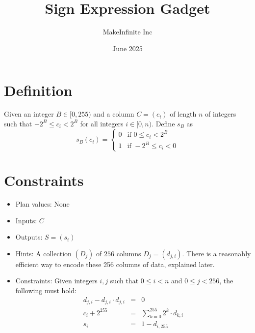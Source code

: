 \documentclass[11pt]{article}
\title{Sign Expression Gadget}
\author{MakeInfinite Inc}
\date{June 2025}
\begin{document}
\maketitle

\section{Definition}
\noindent Given an integer $B\in [0,255)$ and a column $C=(c_{i})$ of length $n$ of integers such that $-2^B\leq c_i<2^B$ for all integers $i\in[0,n)$. Define $s_B$ as 
$$s_B(c_i) = 
\begin{cases} 
0 & \text{if } 0\leq c_i<2^B\\
1 & \text{if } -2^B\leq c_i<0
\end{cases}$$
\section{Constraints}
\begin{itemize}
    \item Plan values: None
    \item Inputs: $C$
    \item Outputs: $S = (s_i)$
    \item Hints: A collection $(D_j)$ of $256$ columns $D_j=(d_{j,i})$. There is a reasonably efficient way to encode these 256 columns of data, explained later.
    \item Constraints:
    Given integers $i, j$ such that $0\leq i<n$ and $0\leq j<256$, the following must hold:
    \begin{eqnarray}
d_{j,i} - d_{j,i}\cdot d_{j,i}&=&0 \\
c_i+2^{255}&=&\sum_{k=0}^{255} 2^k\cdot d_{k,i} \\
s_i&=&1-d_{i, 255}
\end{eqnarray}
    
    
\end{itemize}
\end{document}

